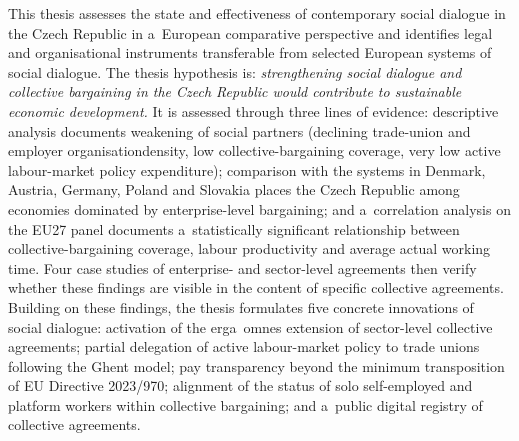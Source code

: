 This thesis assesses the state and effectiveness of contemporary social dialogue in the Czech Republic in a~European comparative perspective and identifies legal and organisational instruments transferable from selected European systems of social dialogue. The thesis hypothesis is: \emph{strengthening social dialogue and collective bargaining in the Czech Republic would contribute to sustainable economic development.} It is assessed through three lines of evidence: descriptive analysis documents weakening of social partners (declining trade-union and employer organisationdensity, low collective-bargaining coverage, very low active labour-market policy expenditure); comparison with the systems in Denmark, Austria, Germany, Poland and Slovakia places the Czech Republic among economies dominated by enterprise-level bargaining; and a~correlation analysis on the EU27 panel documents a~statistically significant relationship between collective-bargaining coverage, labour productivity and average actual working time. Four case studies of enterprise- and sector-level agreements then verify whether these findings are visible in the content of specific collective agreements. Building on these findings, the thesis formulates five concrete innovations of social dialogue: activation of the erga~omnes extension of sector-level collective agreements; partial delegation of active labour-market policy to trade unions following the Ghent model; pay transparency beyond the minimum transposition of EU Directive 2023/970; alignment of the status of solo self-employed and platform workers within collective bargaining; and a~public digital registry of collective agreements.

